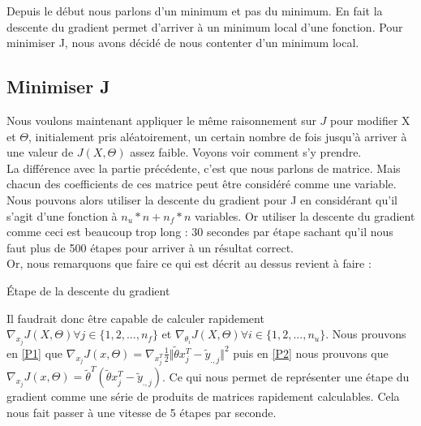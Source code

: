 \documentclass[a4paper,10pt]{article}
\begin{document}
Depuis le début nous parlons d'un minimum et pas du minimum. En fait la descente du gradient permet d'arriver à un minimum local d'une fonction. Pour minimiser J, nous avons décidé de nous contenter d'un minimum local.

\subsection{Minimiser J}

Nous voulons maintenant appliquer le même raisonnement sur $J$ pour modifier X et $\Theta$, initialement pris aléatoirement, un certain nombre de fois jusqu'à arriver à une valeur de $J(X, \Theta)$ assez faible. Voyons voir comment s'y prendre.\\

La différence avec la partie précédente, c'est que nous parlons de matrice. Mais chacun des coefficients de ces matrice peut être considéré comme une variable. Nous pouvons alors utiliser la descente du gradient pour J en considérant qu'il s'agit d'une fonction à $n_u * n + n_f * n$ variables. Or utiliser la descente du gradient comme ceci est beaucoup trop long : 30 secondes par étape sachant qu'il nous faut plus de 500 étapes pour arriver à un résultat correct.\\

Or, nous remarquons que faire ce qui est décrit au dessus revient à faire :

\begin{algorithm}
\caption{Étape de la descente du gradient}
\end{algorithm}

Il faudrait donc être capable de calculer rapidement $\nabla_{x_{j}}J(X, \Theta) \forall j \in \{1, 2, ..., n_f\}$ et $\nabla_{\theta_{i}} J(X, \Theta) \forall i \in \{1, 2, ..., n_u\}$.
Nous prouvons en \ref{P1} que $ \nabla_{x_{j}}J(x, \Theta) = \nabla_{x_{j}^T}\frac{1}{2}\Vert\tilde{\theta}x_{j}^{T}-\tilde{y}_{.,j}\Vert^{2}$
puis en \ref{P2} nous prouvons que $ \nabla_{x_{j}}J(x, \Theta) =  \tilde{\theta}^{T}(\tilde{\theta}x_{j}^{T}-\tilde{y}_{.,j})$. Ce qui nous permet de représenter une étape du gradient comme une série de produits de matrices rapidement calculables. Cela nous fait passer à une vitesse de 5 étapes par seconde.
\end{document}
